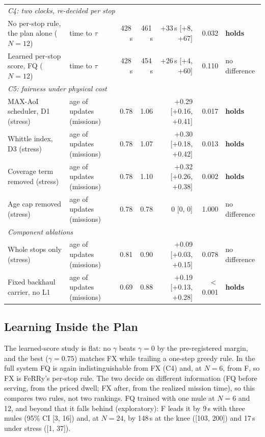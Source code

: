 \documentclass[conference]{IEEEtran}
\begin{document}
\begin{table}[t]
{\begin{tabular}{l l rr r r l}
\midrule
\multicolumn{7}{l}{\textit{C4: two clocks, re-decided per stop}} \\
\quad No per-stop rule, the plan alone ($N{=}12$) & time to $\tau$ & 428\,s & 461\,s & +33\,s [+8, +67] & 0.032 & \textbf{holds} \\
\quad Learned per-stop score, FQ ($N{=}12$) & time to $\tau$ & 428\,s & 454\,s & +26\,s [+4, +60] & 0.110 & no difference \\
\midrule
\multicolumn{7}{l}{\textit{C5: fairness under physical cost}} \\
\quad MAX-AoI scheduler, D1 (stress) & age of updates (missions) & 0.78 & 1.06 & +0.29 [+0.16, +0.41] & 0.017 & \textbf{holds} \\
\quad Whittle index, D3 (stress) & age of updates (missions) & 0.78 & 1.07 & +0.30 [+0.18, +0.42] & 0.013 & \textbf{holds} \\
\quad Coverage term removed (stress) & age of updates (missions) & 0.78 & 1.10 & +0.32 [+0.26, +0.38] & 0.002 & \textbf{holds} \\
\quad Age cap removed (stress) & age of updates (missions) & 0.78 & 0.78 & 0 [0, 0] & 1.000 & no difference \\
\midrule
\multicolumn{7}{l}{\textit{Component ablations}} \\
\quad Whole stops only (stress) & age of updates (missions) & 0.81 & 0.90 & +0.09 [+0.03, +0.15] & 0.078 & no difference \\
\quad Fixed backhaul carrier, no L1 & age of updates (missions) & 0.69 & 0.88 & +0.19 [+0.13, +0.28] & $<$0.001 & \textbf{holds} \\
\bottomrule
\end{tabular}%
}
\end{table}
\subsection{Learning Inside the Plan}
\label{sec:res:rl}

The learned-score study is flat: no $\gamma$ beats $\gamma=0$ by the
pre-registered margin, and the best ($\gamma=0.75$) matches FX while trailing a
one-step greedy rule. In the full system FQ is again indistinguishable from FX
(C4) and, at $N=6$, from F, so FX is FeRRy's per-stop rule. The two decide on
different information (FQ before serving, from the priced dwell; FX after, from
the realized mission time), so this compares two rules, not two rankings. FQ
trained with one mule at $N=6$ and 12, and beyond that it falls behind
(exploratory): F leads it by 9\,s with three mules (95\% CI [3, 16]) and, at
$N=24$, by 148\,s at the knee ([103, 200]) and 17\,s under stress ([1, 37]).
\end{document}
